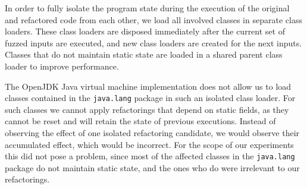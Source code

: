 \documentclass[sigconf]{acmart}
\begin{document}
In order to fully isolate the program state during the execution of the original and refactored code from each other, we load all involved classes in separate
class loaders. These class loaders are disposed immediately after the current set
of fuzzed inputs are executed, and new class loaders are created for the next
inputs. %
Classes that do not maintain static state are loaded in a shared
parent class loader to improve performance.

The OpenJDK Java virtual machine implementation does not allow us to load
classes contained in the \lstinline[breaklines=true]{java.lang} package in such an isolated class
loader. For such classes we cannot apply refactorings that depend on static
fields, as they cannot be reset and will retain the state of previous
executions. Instead of observing the effect of one isolated refactoring
candidate, we would observe their accumulated effect, which would be incorrect.
For the scope of our
experiments this did not pose a problem, since most of the affected classes in
the \lstinline[breaklines=true]{java.lang} package do not maintain static state, and the ones who do
were irrelevant to our refactorings.




\end{document}

